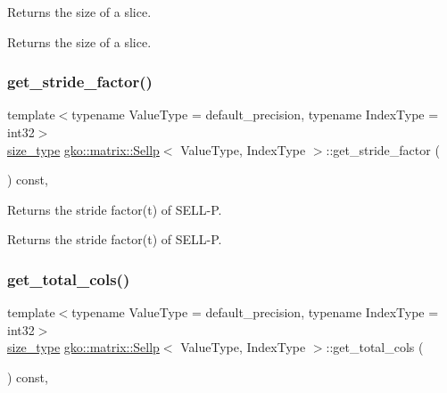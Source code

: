 Returns the size of a slice. 

\begin{DoxyReturn}{Returns}
the size of a slice. 
\end{DoxyReturn}
\mbox{\label{classgko_1_1matrix_1_1Sellp_a34c7942cac3db5a9c4c0b609d2a5540b}} 
\subsubsection{\texorpdfstring{get\+\_\+stride\+\_\+factor()}{get\_stride\_factor()}}
{\footnotesize\ttfamily template$<$typename Value\+Type = default\+\_\+precision, typename Index\+Type = int32$>$ \\
\hyperlink{namespacegko_a6e5c95df0ae4e47aab2f604a22d98ee7}{size\+\_\+type} \hyperlink{classgko_1_1matrix_1_1Sellp}{gko\+::matrix\+::\+Sellp}$<$ Value\+Type, Index\+Type $>$\+::get\+\_\+stride\+\_\+factor (\begin{DoxyParamCaption}{ }\end{DoxyParamCaption}) const\hspace{0.3cm}{\ttfamily [inline]}, {\ttfamily [noexcept]}}



Returns the stride factor(t) of S\+E\+L\+L-\/P. 

\begin{DoxyReturn}{Returns}
the stride factor(t) of S\+E\+L\+L-\/P. 
\end{DoxyReturn}
\mbox{\label{classgko_1_1matrix_1_1Sellp_a3e5ca0f4968f29f97b5a42aac4d08b3d}} 
\subsubsection{\texorpdfstring{get\+\_\+total\+\_\+cols()}{get\_total\_cols()}}
{\footnotesize\ttfamily template$<$typename Value\+Type = default\+\_\+precision, typename Index\+Type = int32$>$ \\
\hyperlink{namespacegko_a6e5c95df0ae4e47aab2f604a22d98ee7}{size\+\_\+type} \hyperlink{classgko_1_1matrix_1_1Sellp}{gko\+::matrix\+::\+Sellp}$<$ Value\+Type, Index\+Type $>$\+::get\+\_\+total\+\_\+cols (\begin{DoxyParamCaption}{ }\end{DoxyParamCaption}) const\hspace{0.3cm}{\ttfamily [inline]}, {\ttfamily [noexcept]}}



